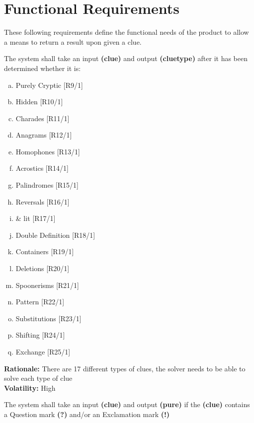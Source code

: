 \section{Functional Requirements}



These following requirements define the functional needs of the product to allow a means to return a result upon given a clue.

\noindent\llap{\textbf{[R8/1]}}The system shall take an input \textbf{\textbf{(clue)}} and output \textbf{(cluetype)} after it has been determined whether it is:

\begin{enumerate} [(a)] %
\item Purely Cryptic 				\hfill{[R9/1]}
\item Hidden 						\hfill{[R10/1]}
\item Charades 						\hfill{[R11/1]}
\item Anagrams 						\hfill{[R12/1]}
\item Homophones 					\hfill{[R13/1]}
\item Acrostics 					\hfill{[R14/1]}
\item Palindromes 					\hfill{[R15/1]}
\item Reversals 					\hfill{[R16/1]}
\item \& lit 						\hfill{[R17/1]}
\item Double Definition 			\hfill{[R18/1]}
\item Containers 					\hfill{[R19/1]}
\item Deletions 					\hfill{[R20/1]}
\item Spoonerisms 					\hfill{[R21/1]}
\item Pattern 						\hfill{[R22/1]}
\item Substitutions 				\hfill{[R23/1]}
\item Shifting 						\hfill{[R24/1]}
\item Exchange 						\hfill{[R25/1]}
\end{enumerate}

\textbf{Rationale:}  There are 17 different types of clues, the solver needs to be able to solve each type of clue\\
\textbf{Volatility:} High

\noindent\llap{\textbf{[R9/1]}}The system shall take an input \textbf{(clue)} and output \textbf{(pure)} if the \textbf{(clue)} contains a Question mark \textbf{(?)} and/or an Exclamation mark \textbf{(!)}\\

